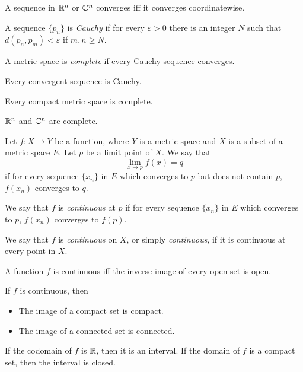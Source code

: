 \begin{prop}
  A sequence in $\mathbb{R}^n$ or $\mathbb{C}^n$ converges iff it converges coordinatewise.
\end{prop}
\begin{defn}
  A sequence $\{p_n\}$ is \emph{Cauchy} if for every $\varepsilon>0$ there is an
  integer $N$ such that $d(p_n,p_m)<\varepsilon$ if $m,n\ge N$.

  A metric space is \emph{complete} if every Cauchy sequence converges.
\end{defn}
\begin{prop}
  Every convergent sequence is Cauchy.
\end{prop}
\begin{prop}
  Every compact metric space is complete.
\end{prop}
\begin{prop}
  $\mathbb{R}^n$ and $\mathbb{C}^n$ are complete.
\end{prop}
\begin{defn}
  Let $f:X\to Y$ be a function, where $Y$ is a metric space and $X$ is a 
  subset of a metric space $E$. Let $p$ be a limit point of $X$. We say that
  \[\lim_{x\to p}f(x)=q\] if for every sequence $\{x_n\}$ in $E$ which converges
  to $p$ but does not contain $p$, $f(x_n)$ converges to $q$.
\end{defn}
\begin{defn}
  We say that $f$ is \emph{continuous} at $p$
  if for every sequence $\{x_n\}$ in $E$ which converges
  to $p$, $f(x_n)$ converges to $f(p)$.

  We say that $f$ is \emph{continuous} on $X$, or simply \emph{continuous},
  if it is continuous at every point in $X$.
\end{defn}
\begin{prop}
  A function $f$ is continuous iff the inverse image of every open set is open.
\end{prop}
\begin{prop}
  If $f$ is continuous, then
  \begin{itemize}
    \item The image of a compact set is compact.
    \item The image of a connected set is connected.
  \end{itemize}
\end{prop}
\begin{cor}
  If the codomain of $f$ is $\mathbb{R}$, then it is an interval. If the domain of $f$
  is a compact set, then the interval is closed.
\end{cor}
